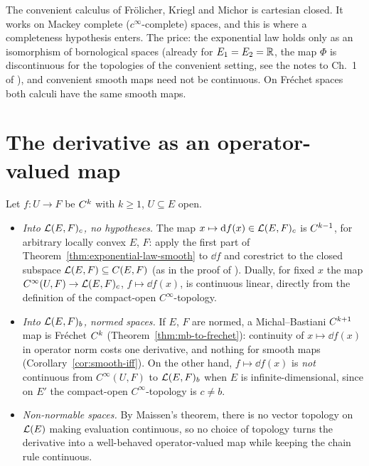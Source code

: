 \begin{remark}
  \label{rem:convenient}
  The convenient calculus of Frölicher, Kriegl and Michor \cite{KM97} is cartesian closed. It
  works on Mackey complete ($c^\infty$-complete) spaces, and this is where a completeness
  hypothesis enters. The price: the exponential law holds only as an isomorphism of
  bornological spaces (already for $E_1 = E_2 = \mathbb{R}$, the map $\Phi$ is discontinuous for the
  topologies of the convenient setting, see the notes to Ch.~1 of \cite{GN26}), and convenient
  smooth maps need not be continuous. On Fréchet spaces both calculi have the same smooth maps.
\end{remark}

\section{The derivative as an operator-valued map}

Let $f \colon U \to F$ be $C^{k}$ with $k \ge 1$, $U \subseteq E$ open.

\begin{itemize}
  \item \emph{Into $\mathcal{L}(E, F)_c$, no hypotheses.} The map $x \mapsto \mathrm{d} f(x) \in
    \mathcal{L}(E, F)_c$ is $C^{k-1}$, for arbitrary locally convex $E$, $F$: apply the first part of
    Theorem~\ref{thm:exponential-law-smooth} to $\dd f$ and corestrict to the closed subspace
    $\mathcal{L}(E, F) \subseteq C(E, F)$ (as in the proof of \cite[Prop.~2.3.17(b)]{GN26}). Dually,
    for fixed $x$ the map $C^\infty(U, F) \to \mathcal{L}(E, F)_c$, $f \mapsto \dd f(x)$, is
    continuous linear, directly from the definition of the compact-open $C^\infty$-topology.
  \item \emph{Into $\mathcal{L}(E, F)_b$, normed spaces.} If $E$, $F$ are normed, a Michal--Bastiani
    $C^{k+1}$ map is Fréchet $C^{k}$ (Theorem~\ref{thm:mb-to-frechet}): continuity of
    $x \mapsto \dd f(x)$ in operator norm costs one derivative, and nothing for smooth maps
    (Corollary~\ref{cor:smooth-iff}). On the other hand, $f \mapsto \dd f(x)$ is \emph{not}
    continuous from $C^\infty(U, F)$ to $\mathcal{L}(E, F)_b$ when $E$ is infinite-dimensional, since
    on $E'$ the compact-open $C^\infty$-topology is $c \ne b$.
  \item \emph{Non-normable spaces.} By Maissen's theorem, there is no vector topology on
    $\mathcal{L}(E)$ making evaluation continuous, so no choice of topology turns the derivative into
    a well-behaved operator-valued map while keeping the chain rule continuous.
\end{itemize}

